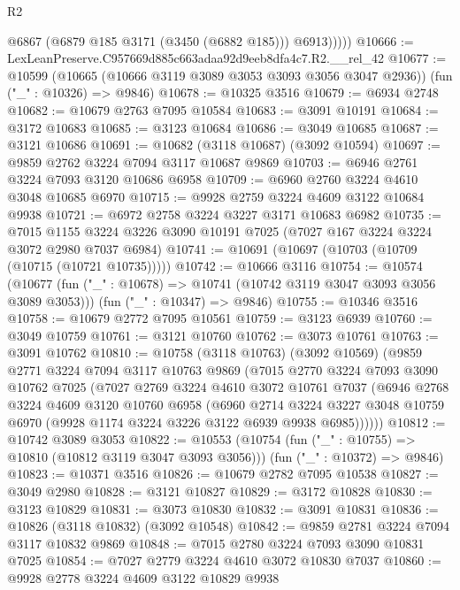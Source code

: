 \begin{lexlean}{R2}
\begin{coremodule}
              @6867
              (@6879 @185 @3171 (@3450 (@6882 @185)))
              @6913)))))
@10666 := LexLeanPreserve.C957669d885c663adaa92d9eeb8dfa4c7.R2.__rel_42
@10677 := @10599
    (@10665 (@10666 @3119 @3089 @3053 @3093 @3056 @3047 @2936))
    (fun ("_" : @10326) => @9846)
@10678 := @10325 @3516
@10679 := @6934 @2748
@10682 := @10679 @2763 @7095 @10584
@10683 := @3091 @10191
@10684 := @3172 @10683
@10685 := @3123 @10684
@10686 := @3049 @10685
@10687 := @3121 @10686
@10691 := @10682 (@3118 @10687) (@3092 @10594)
@10697 := @9859 @2762 @3224 @7094 @3117 @10687 @9869
@10703 := @6946 @2761 @3224 @7093 @3120 @10686 @6958
@10709 := @6960 @2760 @3224 @4610 @3048 @10685 @6970
@10715 := @9928 @2759 @3224 @4609 @3122 @10684 @9938
@10721 := @6972 @2758 @3224 @3227 @3171 @10683 @6982
@10735 := @7015
    @1155
    @3224
    @3226
    @3090
    @10191
    @7025
    (@7027 @167 @3224 @3224 @3072 @2980 @7037 @6984)
@10741 := @10691 (@10697 (@10703 (@10709 (@10715 (@10721 @10735)))))
@10742 := @10666 @3116
@10754 := @10574
    (@10677 (fun ("_" : @10678) => @10741 (@10742 @3119 @3047 @3093 @3056 @3089 @3053)))
    (fun ("_" : @10347) => @9846)
@10755 := @10346 @3516
@10758 := @10679 @2772 @7095 @10561
@10759 := @3123 @6939
@10760 := @3049 @10759
@10761 := @3121 @10760
@10762 := @3073 @10761
@10763 := @3091 @10762
@10810 := @10758
    (@3118 @10763)
    (@3092 @10569)
    (@9859
      @2771
      @3224
      @7094
      @3117
      @10763
      @9869
      (@7015
        @2770
        @3224
        @7093
        @3090
        @10762
        @7025
        (@7027
          @2769
          @3224
          @4610
          @3072
          @10761
          @7037
          (@6946
            @2768
            @3224
            @4609
            @3120
            @10760
            @6958
            (@6960
              @2714
              @3224
              @3227
              @3048
              @10759
              @6970
              (@9928 @1174 @3224 @3226 @3122 @6939 @9938 @6985))))))
@10812 := @10742 @3089 @3053
@10822 := @10553
    (@10754 (fun ("_" : @10755) => @10810 (@10812 @3119 @3047 @3093 @3056)))
    (fun ("_" : @10372) => @9846)
@10823 := @10371 @3516
@10826 := @10679 @2782 @7095 @10538
@10827 := @3049 @2980
@10828 := @3121 @10827
@10829 := @3172 @10828
@10830 := @3123 @10829
@10831 := @3073 @10830
@10832 := @3091 @10831
@10836 := @10826 (@3118 @10832) (@3092 @10548)
@10842 := @9859 @2781 @3224 @7094 @3117 @10832 @9869
@10848 := @7015 @2780 @3224 @7093 @3090 @10831 @7025
@10854 := @7027 @2779 @3224 @4610 @3072 @10830 @7037
@10860 := @9928 @2778 @3224 @4609 @3122 @10829 @9938

\end{coremodule}
\end{lexlean}
